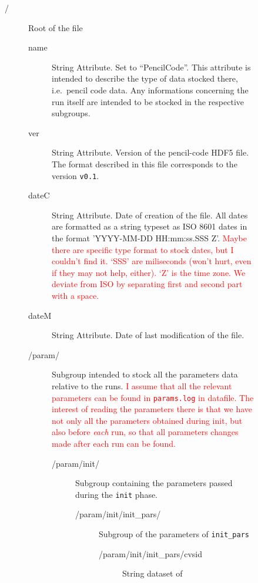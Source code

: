 \documentclass[a4paper,12pt]{article}
\newcommand{\note}[1]{\textcolor{red}{#1}}
\begin{document}
\begin{figure}[p] \centering
  \parbox{18cm}{\scriptsize %
    \begin{description}
    \item[/]  Root of the file
      \begin{description}
      \item[name] String Attribute. Set to ``PencilCode''. This attribute
        is intended to describe the type of data stocked there,
        i.e.\  pencil code data. Any informations concerning the run itself
    are intended to be stocked in the respective subgroups.
  \item[ver] String Attribute. Version of the
    pencil-code HDF5 file. The format described in this file
    corresponds to the version \texttt{v0.1}. 
  \item[dateC] String Attribute. Date of creation of the
    file. All dates are formatted as a string typeset as ISO 8601 dates in
    the format 'YYYY-MM-DD HH:mm:ss.SSS Z'.
    \note{Maybe there are specific type format to stock dates,
      but I couldn't find it.}%
    \note{`SSS' are miliseconds (won't hurt, even if they may not help,
      either).
      `Z' is the time zone.
      We deviate from ISO by separating first and second part with a space.
    }
  \item[dateM] String Attribute. Date of last modification of the
    file.
  \item[/param/] Subgroup intended to stock all the parameters data
    relative to the runs. \note{I assume that all the relevant
      parameters can be found in \texttt{params.log} in datafile. The interest
      of reading the parameters there is that we have not only all the
      parameters obtained during init, but also before \emph{each} run,
      so that all parameters changes made after each run can be
      found.}
    \begin{description}
    \item[/param/init/] Subgroup containing the parameters
      passed during the \texttt{init} phase.
      \begin{description}
      \item[/param/init/init\_pars/]
        Subgroup of the parameters of
        \texttt{init\_pars}
        \begin{description}
          \item[/param/init/init\_pars/cvsid] String dataset of

\end{description}
\end{description}
\end{description}
\end{description}
\end{description}}
\end{figure}
\end{document}
